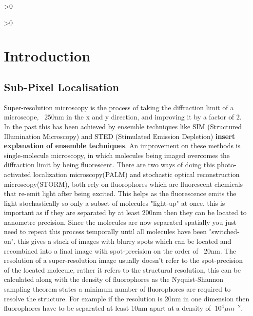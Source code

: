 \documentclass[aps,pra,a4paper,nofootinbib,onecolumn,tightenlines,longbibliography,12pt,amsfonts,amssymb,amsmath,floatfix]{revtex4-2} %
\begin{document}
\newpage
\tableofcontents %
\makeatletter
\let\toc@pre\relax
\let\toc@post\relax
\makeatother

\ifnum\totalfigures>0
\newpage
\listoffigures
{}
\fi

\ifnum\totaltables>0
\newpage
\listoftables
{}
\fi





\newpage
{}

\section{Introduction}

  \subsection{Sub-Pixel Localisation} %
  \label{sub:spot-finding intro}
  
  Super-resolution microscopy is the process of taking the diffraction limit 
  of a microscope, ~250nm in the x and y direction, and improving it by a 
  factor of 2. In the past this has been achieved by ensemble techniques
  like SIM (Structured Illumination Microscopy) and STED (Stimulated Emission Depletion)
  \textbf{insert explanation of ensemble techniques}. An improvement on these methods 
  is single-molecule microscopy, in which molecules being imaged overcomes the 
  diffraction limit by being fluorescent. There are two ways of doing this photo-activated localization
  microscopy(PALM) and stochastic optical reconstruction microscopy(STORM), both
  rely on fluorophores which are fluorescent chemicals that re-emit light after
  being excited. This helps as the fluorescence emits the light 
  stochastically so only a subset of molecules "light-up" at once, this is important 
  as if they are separated by at least 200nm then they can be located to nanometre precision. 
  Since the molecules are now separated spatially you just need to repeat this process temporally
  until all molecules have been "switched-on", this gives a stack of images with blurry spots
  which can be located and recombined into a final image with spot-precision on the order of ~20nm.\cite{galbraith2011super}
  The resolution of a super-resolution image usually doesn't refer to the spot-precision of the 
  located molecule, rather it refers to the structural resolution, this can be calculated along 
  with the density of fluorophores as the Nyquist-Shannon sampling theorem states a minimum number 
  of fluorophores are required to resolve the structure. For example if the resolution is 20nm in 
  one dimension then fluorophores have to be separated at least 10nm apart at a density of 
  $~10^4\mu m^{-2}$.\cite{van2011single}\cite{shannon1949communication}
\end{document}
